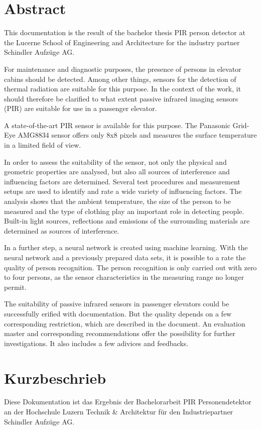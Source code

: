 \chapter*{Abstract}
\label{chap:abstract_englisch}
This documentation is the result of the bachelor thesis PIR person detector at the Lucerne School of Engineering and Architecture for the industry partner Schindler Aufzüge AG.

For maintenance and diagnostic purposes, the presence of persons in elevator cabins should be detected. Among other things, sensors for the detection of thermal radiation are suitable for this purpose. In the context of the work, it should therefore be clarified to what extent passive infrared imaging sensors (PIR) are suitable for use in a passenger elevator. 

A state-of-the-art PIR sensor is available for this purpose. The Panasonic Grid-Eye AMG8834 sensor offers only 8x8 pixels and measures the surface temperature in a limited field of view.  

In order to assess the suitability of the sensor, not only the physical and geometric properties are analysed, but also all sources of interference and influencing factors are determined. Several test procedures and measurement setups are used to identify and rate a wide variety of influencing factors. The analysis shows that the ambient temperature, the size of the person to be measured and the type of clothing play an important role in detecting people. Built-in light sources, reflections and emissions of the surrounding materials are determined as sources of interference.  

In a further step, a neural network is created using machine learning. With the  neural network and a previously prepared data sets, it is possible to a rate the quality of person recognition. The person recognition is only carried out with zero to four persons, as the sensor characteristics in the measuring range no longer permit. 

The suitability of passive infrared sensors in passenger elevators could be successfully erified with documentation. But the quality depends on a few corresponding restriction, which are described in the document. An evaluation master and corresponding recommendations offer the possibility for further investigations. It also includes a few adivices and feedbacks. 


\chapter*{Kurzbeschrieb}
\label{chap:abstract_german}
Diese Dokumentation ist das Ergebnis der Bachelorarbeit {PIR} Personendetektor an der Hochschule Luzern Technik \& Architektur für den Industriepartner Schindler Aufzüge AG. 

